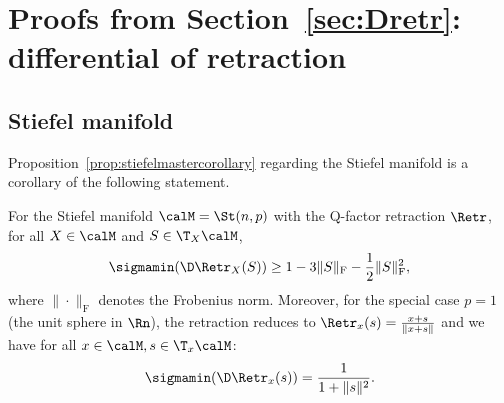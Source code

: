 \section{Proofs from Section~\ref{sec:Dretr}: differential of retraction} \label{sec:proofsDretr}

\subsection*{Stiefel manifold}

Proposition~\ref{prop:stiefelmastercorollary} regarding the Stiefel manifold is a corollary of the following statement.
\begin{lemma} \label{lemma:stiefelbound}
	For the Stiefel manifold $\calM = \St(n,p)$ with the Q-factor retraction $\Retr$, for all $X \in \calM$ and $S \in \T_X\calM$,
	\begin{align*}
	\sigmamin(\D\Retr_X(S)) \geq 1 - 3\|S\|_{\mathrm{F}} - \frac{1}{2}\|S\|_{\mathrm{F}}^2,
	\end{align*}
	where $\|\cdot\|_{\mathrm{F}}$ denotes the Frobenius norm. Moreover, for the special case $p = 1$ (the unit sphere in $\Rn$), the retraction reduces to $\Retr_x(s) = \frac{x+s}{\|x+s\|}$ and we have for all $x \in \calM, s \in \T_x\calM$:
	\begin{align*}
	\sigmamin(\D\Retr_x(s)) = \frac{1}{1 + \|s\|^2}.
	\end{align*}
\end{lemma}
